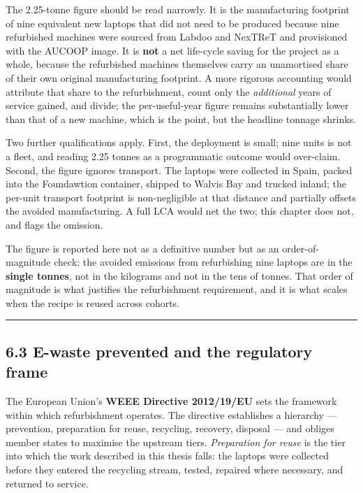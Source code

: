 The 2.25-tonne figure should be read narrowly. It is the manufacturing
footprint of nine equivalent new laptops that did not need to be
produced because nine refurbished machines were sourced from Labdoo and
NexTReT and provisioned with the AUCOOP image. It is \textbf{not} a net
life-cycle saving for the project as a whole, because the refurbished
machines themselves carry an unamortised share of their own original
manufacturing footprint. A more rigorous accounting would attribute that
share to the refurbishment, count only the \emph{additional} years of
service gained, and divide; the per-useful-year figure remains
substantially lower than that of a new machine, which is the point, but
the headline tonnage shrinks.

Two further qualifications apply. First, the deployment is small; nine
units is not a fleet, and reading 2.25 tonnes as a programmatic outcome
would over-claim. Second, the figure ignores transport. The laptops were
collected in Spain, packed into the Foundawtion container, shipped to
Walvis Bay and trucked inland; the per-unit transport footprint is
non-negligible at that distance and partially offsets the avoided
manufacturing. A full LCA would net the two; this chapter does not, and
flags the omission.

The figure is reported here not as a definitive number but as an
order-of-magnitude check: the avoided emissions from refurbishing nine
laptops are in the \textbf{single tonnes}, not in the kilograms and not
in the tens of tonnes. That order of magnitude is what justifies the
refurbishment requirement, and it is what scales when the recipe is
reused across cohorts.

\begin{center}\rule{0.5\linewidth}{0.5pt}\end{center}

\hypertarget{e-waste-prevented-and-the-regulatory-frame}{%
\subsection{6.3 E-waste prevented and the regulatory
frame}\label{e-waste-prevented-and-the-regulatory-frame}}

The European Union's \textbf{WEEE Directive 2012/19/EU} sets the
framework within which refurbishment operates. The directive establishes
a hierarchy --- prevention, preparation for reuse, recycling, recovery,
disposal --- and obliges member states to maximise the upstream tiers.
\emph{Preparation for reuse} is the tier into which the work described
in this thesis falls: the laptops were collected before they entered the
recycling stream, tested, repaired where necessary, and returned to
service.

